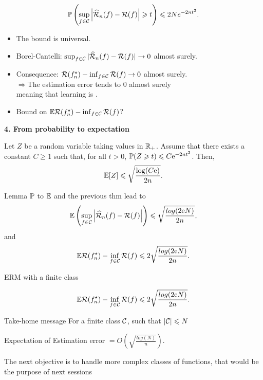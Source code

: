 \documentclass[xcolor={usenames,dvipsnames},handout]{beamer}
\begin{document}
\begin{frame}
$$
\P \left( \sup_{f\in \Cc} \left| \widehat{\Rc}_n(f) - \Rc(f)  \right| \geq t  \right) \leq 2N e^{-2nt^2}.
$$
\begin{itemize}
\item The bound is universal.
\item Borel-Cantelli: $\sup_{f\in \Cc} |\widehat{\Rc}_n(f) - \Rc(f) | \to 0$ almost surely. 
\item Consequence: $\Rc(f_n^\star) - \inf_{f\in \Cc} \Rc(f)  \to 0$  almost surely. \\
$ \Rightarrow$The estimation error tends to 0 almost surely\\
 meaning that learning is .
\item Bound on $\E \Rc (f_n^\star) - \inf_{f\in \Cc} \Rc(f)$?
\end{itemize}
\end{frame}

\begin{frame}

\textbf{4. From probability to expectation} \hfill \\
\begin{lemma}[$\P$ to $\E$]
\label{lem:PtoE}
Let $Z$ be a random variable taking values in $\R_+$. Assume that there exists a constant $C\geq 1$ such that, for all $t>0$, $\P (Z\geq t) \leq  C \mathrm{e}^{-2nt^2}$.
Then,
$$
\E [Z]\leq  \sqrt{\frac{\log(C\mathrm{e})}{2n}}.
$$
\end{lemma}


Lemma $\P$ to $\E$ and the previous thm lead to
$$
 \E \left(  \sup_{f\in \Cc} \left| \widehat{\Rc}_n(f) - \Rc(f)  \right| \right) \leq \sqrt{\frac{log(2\mathrm{e}N)}{2n}},
$$
and
$$
\E \Rc( f_n^\star) - \inf_{f\in\Cc} \Rc (f) \leq 2 \sqrt{\frac{log(2\mathrm{e}N)}{2n}}.
$$
\end{frame}

\begin{frame}{ERM with a finite class}

$$
\E \Rc( f_n^\star) - \inf_{f\in\Cc} \Rc (f) \leq 2 \sqrt{\frac{log(2\mathrm{e}N)}{2n}}.
$$
\begin{alertblock}{Take-home message}
For a finite class $\Cc$, such that $|\Cc|\leq N$
\begin{center}
Expectation of Estimation error $= O \left(\sqrt{\frac{log(N)}{n}} \right)   $.
\end{center}
\end{alertblock}

The next objective is to handle more complex classes of functions, that would be the purpose of next sessions

\vspace{.2cm}


\end{frame}
\end{document}
